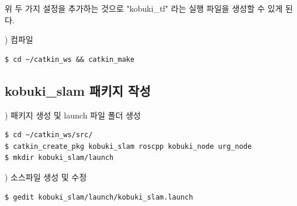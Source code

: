 \noindent
위 두 가지 설정을 추가하는 것으로 "kobuki\_tf" 라는 실행 파일을 생성할 수 있게 된다.

\vspace{\baselineskip}
\noindent
{}
\thenum) 컴파일

\vspace{\baselineskip}
\begin{lstlisting}[language=ROS]
$ cd ~/catkin_ws && catkin_make
\end{lstlisting}



\subsection{kobuki\_slam 패키지 작성}

\setcounter{num}{0}

\vspace{\baselineskip}
\noindent
{}
\thenum) 패키지 생성 및 launch 파일 폴더 생성

\vspace{\baselineskip}
\begin{lstlisting}[language=ROS]
$ cd ~/catkin_ws/src/
$ catkin_create_pkg kobuki_slam roscpp kobuki_node urg_node
$ mkdir kobuki_slam/launch
\end{lstlisting}


\vspace{\baselineskip}
\noindent
{}
\thenum) 소스파일 생성 및 수정

\begin{lstlisting}[language=ROS]
$ gedit kobuki_slam/launch/kobuki_slam.launch
\end{lstlisting}


